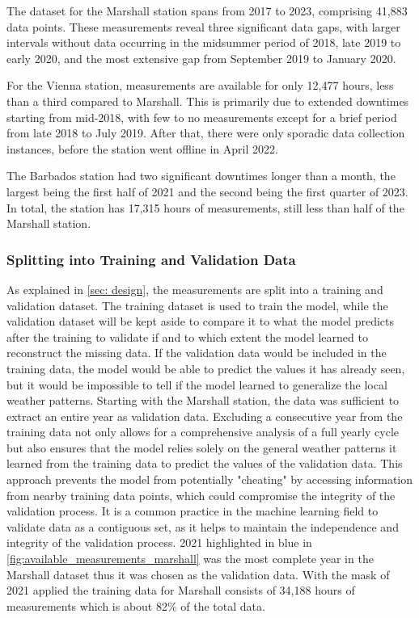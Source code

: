 The dataset for the Marshall station spans from 2017 to 2023, comprising 41,883 data points. These measurements reveal three significant data gaps, with larger intervals without data occurring in the midsummer period of 2018, late 2019 to early 2020, and the most extensive gap from September 2019 to January 2020.

For the Vienna station, measurements are available for only 12,477 hours, less than a third compared to Marshall. This is primarily due to extended downtimes starting from mid-2018, with few to no measurements except for a brief period from late 2018 to July 2019. After that, there were only sporadic data collection instances, before the station went offline in April 2022.

The Barbados station had two significant downtimes longer than a month, the largest being the first half of 2021 and the second being the first quarter of 2023. In total, the station has 17,315 hours of measurements, still less than half of the Marshall station.

\subsubsection*{Splitting into Training and Validation Data}

As explained in \autoref{sec: design}, the measurements are split into a training and validation dataset. The training dataset is used to train the model, while the validation dataset will be kept aside to compare it to what the model predicts after the training to validate if and to which extent the model learned to reconstruct the missing data. If the validation data would be included in the training data, the model would be able to predict the values it has already seen, but it would be impossible to tell if the model learned to generalize the local weather patterns.
Starting with the Marshall station, the data was sufficient to extract an entire year as validation data. Excluding a consecutive year from the training data not only allows for a comprehensive analysis of a full yearly cycle but also ensures that the model relies solely on the general weather patterns it learned from the training data to predict the values of the validation data. This approach prevents the model from potentially "cheating" by accessing information from nearby training data points, which could compromise the integrity of the validation process. It is a common practice in the machine learning field to validate data as a contiguous set, as it helps to maintain the independence and integrity of the validation process. 2021 highlighted in blue in \ref{fig:available_measurements_marshall} was the most complete year in the Marshall dataset thus it was chosen as the validation data. With the mask of 2021 applied the training data for Marshall consists of 34,188 hours of measurements which is about 82\% of the total data.

